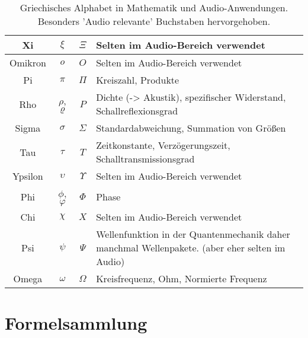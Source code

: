 \begin{table}[H]
\begin{tabular}{|c|c|c|p{7cm}|}
        \hline
        Xi      & $\xi$    & $\Xi$ & Selten im Audio-Bereich verwendet \\
        \hline
        Omikron & $o$      & $O$ & Selten im Audio-Bereich verwendet \\
        \hline
        \rowcolor{tableHighligh}
        Pi      & $\pi$    & $\Pi$ & Kreiszahl, Produkte \\
        \hline
        \rowcolor{tableHighligh}
        Rho     & $\rho$, $\varrho$   & $P$ & Dichte (-> Akustik), spezifischer Widerstand,  Schallreflexionsgrad \\
        \hline
        \rowcolor{tableHighligh}
        Sigma   & $\sigma$ & $\Sigma$ & Standardabweichung, Summation von Größen \\
        \hline
        \rowcolor{tableHighligh}
        Tau     & $\tau$   & $T$ & Zeitkonstante, Verzögerungszeit, Schalltransmissionsgrad \\
        \hline
        Ypsilon & $\upsilon$ & $\Upsilon$ & Selten im Audio-Bereich verwendet \\
        \hline
        \rowcolor{tableHighligh}
        Phi     & $\phi$, $\varphi$   & $\Phi$ & Phase \\
        \hline
        Chi     & $\chi$   & $X$ & Selten im Audio-Bereich verwendet \\
        \hline
        Psi     & $\psi$   & $\Psi$ & Wellenfunktion in der Quantenmechanik daher manchmal Wellenpakete. (aber eher selten im Audio) \\
        \hline
        \rowcolor{tableHighligh}
        Omega   & $\omega$ & $\Omega$ & Kreisfrequenz, Ohm, Normierte Frequenz \\
        \hline
    \end{tabular}
    \caption{Griechisches Alphabet in Mathematik und Audio-Anwendungen. Besonders 'Audio relevante' Buchstaben hervorgehoben.}
\end{table}


\section*{Formelsammlung}



